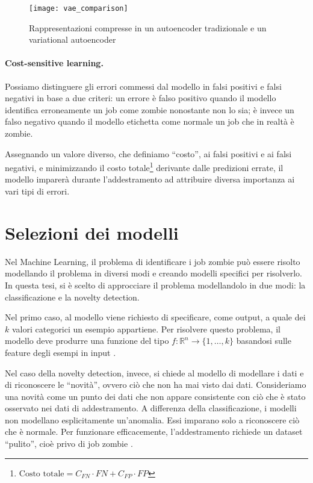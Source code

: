 \begin{figure}
    \centering
    \texttt{[image: vae\_comparison]}
    \caption{Rappresentazioni compresse in un autoencoder tradizionale e un
    variational autoencoder \cite{shafkat2018}}
    \label{fig:vae_comparison}
\end{figure}

\paragraph{Cost-sensitive learning.}

Possiamo distinguere gli errori commessi dal modello in falsi positivi e falsi
negativi in base a due criteri: un errore è falso positivo quando il modello
identifica erroneamente un job come zombie nonostante non lo sia; è invece un
falso negativo quando il modello etichetta come normale un job che in realtà è
zombie.

Assegnando un valore diverso, che definiamo ``costo'', ai falsi positivi e ai
falsi negativi, e minimizzando il costo totale\footnote{$\text{Costo totale} =
    C_{FN} \cdot
FN + C_{FP} \cdot FP$} derivante dalle predizioni
errate, il modello imparerà durante l'addestramento ad attribuire diversa
importanza ai vari tipi di errori.


\section{Selezioni dei modelli}

Nel Machine Learning, il problema di identificare i job zombie può essere
risolto modellando il problema in diversi modi e creando modelli specifici per
risolverlo. In questa tesi, si è scelto di approcciare il problema
modellandolo in due modi: la classificazione e la novelty detection.

Nel primo caso, al modello viene richiesto di specificare, come output, a
quale dei $k$ valori categorici un esempio appartiene. Per risolvere questo
problema, il modello deve produrre una funzione del tipo
$f:\mathbb{R}^n\to\{1,\ldots,k\}$ basandosi sulle feature degli esempi in
input \cite{Goodfellow2016}.

Nel caso della novelty detection, invece, si chiede al modello di modellare i
dati e di riconoscere le ``novità'', ovvero ciò che non ha mai visto dai dati.
Consideriamo una novità come un punto dei dati che non appare consistente con
ciò che è stato osservato nei dati di addestramento. A differenza della
classificazione, i  modelli non modellano esplicitamente un'anomalia. Essi
imparano solo a riconoscere ciò che è normale. Per funzionare efficacemente,
l'addestramento richiede un dataset ``pulito'', cioè privo di job zombie
\cite{geron2019, pimentel2014}.

